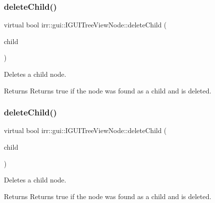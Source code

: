 \subsubsection{\texorpdfstring{delete\+Child()}{deleteChild()}\hspace{0.1cm}{\footnotesize\ttfamily [1/2]}}
{\footnotesize\ttfamily virtual bool irr\+::gui\+::\+I\+G\+U\+I\+Tree\+View\+Node\+::delete\+Child (\begin{DoxyParamCaption}\item[{\hyperlink{classirr_1_1gui_1_1IGUITreeViewNode}{I\+G\+U\+I\+Tree\+View\+Node} $\ast$}]{child }\end{DoxyParamCaption})\hspace{0.3cm}{\ttfamily [pure virtual]}}



Deletes a child node. 

\begin{DoxyReturn}{Returns}
Returns true if the node was found as a child and is deleted. 
\end{DoxyReturn}
\mbox{\label{classirr_1_1gui_1_1IGUITreeViewNode_a26d0ce5bc0a6e7814f69d68033c30242}} 
\subsubsection{\texorpdfstring{delete\+Child()}{deleteChild()}\hspace{0.1cm}{\footnotesize\ttfamily [2/2]}}
{\footnotesize\ttfamily virtual bool irr\+::gui\+::\+I\+G\+U\+I\+Tree\+View\+Node\+::delete\+Child (\begin{DoxyParamCaption}\item[{\hyperlink{classirr_1_1gui_1_1IGUITreeViewNode}{I\+G\+U\+I\+Tree\+View\+Node} $\ast$}]{child }\end{DoxyParamCaption})\hspace{0.3cm}{\ttfamily [pure virtual]}}



Deletes a child node. 

\begin{DoxyReturn}{Returns}
Returns true if the node was found as a child and is deleted. 
\end{DoxyReturn}
\mbox{\label{classirr_1_1gui_1_1IGUITreeViewNode_a33cbd8c146ec27a4812548a32d81732b}} 
